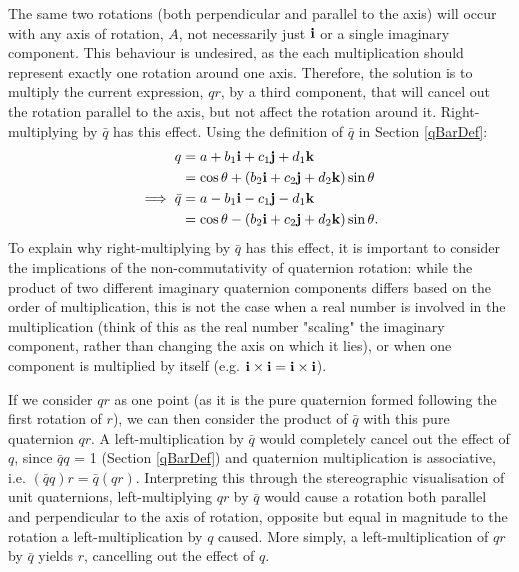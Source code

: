 \documentclass[10pt]{article}
\begin{document}
The same two rotations (both perpendicular and parallel to the axis) will occur with any axis of rotation, $A$, not necessarily just $\vb{i}$ or a single imaginary component. This behaviour is undesired, as the each multiplication should represent exactly one rotation around one axis. Therefore, the solution is to multiply the current expression, $qr$, by a third component, that will cancel out the rotation parallel to the axis, but not affect the rotation around it. Right-multiplying by $\bar{q}$ has this effect. Using the definition of $\bar{q}$ in Section \ref{qBarDef}:
\begin{equation}
    \begin{aligned}
        q &= a + b_1\vb{i} + c_1\vb{j} + d_1\vb{k} \\
          &= \cos\theta + (b_2\vb{i} + c_2\vb{j} + d_2\vb{k})\sin\theta \\
        \implies \bar{q} &= a - b_1\vb{i} - c_1\vb{j} - d_1\vb{k} \\
          &= \cos\theta - (b_2\vb{i} + c_2\vb{j} + d_2\vb{k})\sin\theta.
    \end{aligned}
\end{equation}
To explain why right-multiplying by $\bar{q}$ has this effect, it is important to consider the implications of the non-commutativity of quaternion rotation: while the product of two different imaginary quaternion components differs based on the order of multiplication, this is not the case when a real number is involved in the multiplication (think of this as the real number "scaling" the imaginary component, rather than changing the axis on which it lies), or when one component is multiplied by itself (e.g. $\vb{i}\times\vb{i} = \vb{i}\times\vb{i}$).

If we consider $qr$ as one point (as it is the pure quaternion formed following the first rotation of $r$), we can then consider the product of $\bar{q}$ with this pure quaternion $qr$. A left-multiplication by $\bar{q}$ would completely cancel out the effect of $q$, since $\bar{q}q$ = 1 (Section \ref{qBarDef}) and quaternion multiplication is associative, i.e. $(\bar{q}q)r = \bar{q}(qr)$. Interpreting this through the stereographic visualisation of unit quaternions, left-multiplying $qr$ by $\bar{q}$ would cause a rotation both parallel and perpendicular to the axis of rotation, opposite but equal in magnitude to the rotation a left-multiplication by $q$ caused. More simply, a left-multiplication of $qr$ by $\bar{q}$ yields $r$, cancelling out the effect of $q$.
\end{document}
